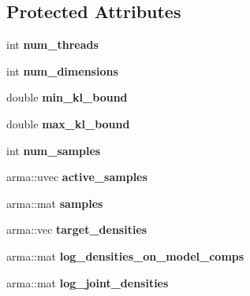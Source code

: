 \subsection*{Protected Attributes}
\begin{DoxyCompactItemize}
\item 
int {\bfseries num\+\_\+threads}\hypertarget{classVIPS_accccca2a57a73de29ee07a8a76c9c941}{}\label{classVIPS_accccca2a57a73de29ee07a8a76c9c941}

\item 
int {\bfseries num\+\_\+dimensions}\hypertarget{classVIPS_ae2fc04069049b703933aa1a1834067a2}{}\label{classVIPS_ae2fc04069049b703933aa1a1834067a2}

\item 
double {\bfseries min\+\_\+kl\+\_\+bound}\hypertarget{classVIPS_abdc5983d1434c2d24a0f96168529921e}{}\label{classVIPS_abdc5983d1434c2d24a0f96168529921e}

\item 
double {\bfseries max\+\_\+kl\+\_\+bound}\hypertarget{classVIPS_a34b0769fc34b3a517c212dc35c5f5fb4}{}\label{classVIPS_a34b0769fc34b3a517c212dc35c5f5fb4}

\item 
int {\bfseries num\+\_\+samples}\hypertarget{classVIPS_ac99a855e6f284c3028435dd23fea3c06}{}\label{classVIPS_ac99a855e6f284c3028435dd23fea3c06}

\item 
arma\+::uvec {\bfseries active\+\_\+samples}\hypertarget{classVIPS_aaddf0e6094bc9cf8e942c464b0e8a552}{}\label{classVIPS_aaddf0e6094bc9cf8e942c464b0e8a552}

\item 
arma\+::mat {\bfseries samples}\hypertarget{classVIPS_a16a3f01a04f8a2aabb4972912e4f105d}{}\label{classVIPS_a16a3f01a04f8a2aabb4972912e4f105d}

\item 
arma\+::vec {\bfseries target\+\_\+densities}\hypertarget{classVIPS_a27193a3430c50755c6342ed370df794b}{}\label{classVIPS_a27193a3430c50755c6342ed370df794b}

\item 
arma\+::mat {\bfseries log\+\_\+densities\+\_\+on\+\_\+model\+\_\+comps}\hypertarget{classVIPS_acd32741f14cf0d1793cf6e64b636fcc0}{}\label{classVIPS_acd32741f14cf0d1793cf6e64b636fcc0}

\item 
arma\+::mat {\bfseries log\+\_\+joint\+\_\+densities}\hypertarget{classVIPS_a4a84ac52b3f3475ad4efeabc6d92c1c3}{}\label{classVIPS_a4a84ac52b3f3475ad4efeabc6d92c1c3}


\end{DoxyCompactItemize}
